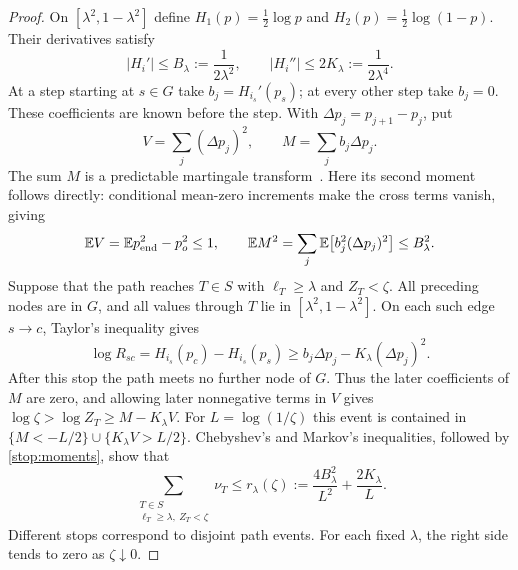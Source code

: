 \begin{proof}
On $[\lambda^2,1-\lambda^2]$ define
$H_1(p)=\tfrac12\log p$ and $H_2(p)=\tfrac12\log(1-p)$.
Their derivatives satisfy
\begin{equation}\label{stop:derivative-constants}
 |H_i'|\le B_\lambda:=\frac1{2\lambda^2},\qquad
 |H_i''|\le2K_\lambda:=\frac1{2\lambda^4}.
\end{equation}
At a step starting at $s\in G$ take $b_j=H_{i_s}'(p_s)$; at every
other step take $b_j=0$.  These coefficients are known before the step.
With $\Delta p_j=p_{j+1}-p_j$, put
\[
 V=\sum_j(\Delta p_j)^2,\qquad M=\sum_j b_j\Delta p_j.
\]
The sum $M$ is a predictable martingale transform~\cite{Burkholder1966}.
Here its second moment follows directly: conditional mean-zero increments
make the cross terms vanish, giving
\begin{equation}\label{stop:moments}
 \mathbb EV=\mathbb E p_{\rm end}^2-p_o^2\le1,
 \qquad
 \mathbb EM^2=\sum_j\mathbb E\bigl[b_j^2(\Delta p_j)^2\bigr]
 \le B_\lambda^2.
\end{equation}
Suppose that the path reaches $T\in S$ with $\ell_T\ge\lambda$ and
$Z_T<\zeta$.  All preceding nodes are in $G$, and all values through
$T$ lie in $[\lambda^2,1-\lambda^2]$.  On each such edge $s\to c$,
Taylor's inequality gives
\[
 \log R_{sc}=H_{i_s}(p_c)-H_{i_s}(p_s)
 \ge b_j\Delta p_j-K_\lambda(\Delta p_j)^2.
\]
After this stop the path meets no further node of $G$.  Thus the later
coefficients of $M$ are zero, and allowing later nonnegative terms in
$V$ gives $\log\zeta>\log Z_T\ge M-K_\lambda V$.
For $L=\log(1/\zeta)$ this event is contained in
$\{M<-L/2\}\cup\{K_\lambda V>L/2\}$.  Chebyshev's and Markov's
inequalities, followed by \eqref{stop:moments}, show that
\begin{equation}\label{stop:probability}
 \sum_{\substack{T\in S\\\ell_T\ge\lambda,\ Z_T<\zeta}}\nu_T
 \le r_\lambda(\zeta):=
 \frac{4B_\lambda^2}{L^2}+\frac{2K_\lambda}{L}.
\end{equation}
Different stops correspond to disjoint path events.  For each fixed
$\lambda$, the right side tends to zero as $\zeta\downarrow0$.


\end{proof}
